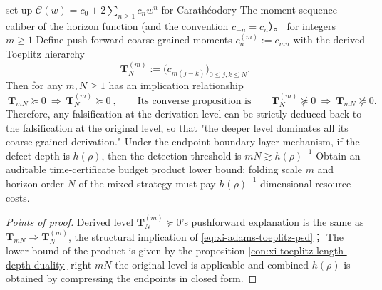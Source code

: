 \begin{conclusion}\label{con:xi-adams-coarsening-backprop-budget-product}
set up \(\mathscr{C}(w)=c_0+2\sum_{n\ge 1}c_n w^n\) for Carath\'eodory The moment sequence caliber of the horizon function (and the convention \(c_{-n}=\overline{c_n}\)）。
for integers \(m\ge 1\) Define push-forward coarse-grained moments
\(
c^{(m)}_n:=c_{mn}
\)
with the derived Toeplitz hierarchy
\[
\mathbf{T}^{(m)}_N:=\bigl(c_{m(j-k)}\bigr)_{0\le j,k\le N}.
\]
Then for any \(m,N\ge 1\) has an implication relationship
\[
\boxed{\ \mathbf{T}_{mN}\succeq 0\ \Longrightarrow\ \mathbf{T}^{(m)}_{N}\succeq 0\ },
\qquad\text{Its converse proposition is}\qquad
\mathbf{T}^{(m)}_{N}\nsucceq 0\ \Longrightarrow\ \mathbf{T}_{mN}\nsucceq 0.
\]
Therefore, any falsification at the derivation level can be strictly deduced back to the falsification at the original level, so that "the deeper level dominates all its coarse-grained derivation."
Under the endpoint boundary layer mechanism, if the defect depth is \(h(\rho)\), then the detection threshold is \(mN\gtrsim h(\rho)^{-1}\) Obtain an auditable time-certificate budget product lower bound: folding scale \(m\) and horizon order \(N\) of the mixed strategy must pay \(h(\rho)^{-1}\) dimensional resource costs.
\end{conclusion}
\begin{proof}[Points of proof]
Derived level \(\mathbf{T}^{(m)}_N\succeq 0\)'s pushforward explanation is the same as \(\mathbf{T}_{mN}\Rightarrow \mathbf{T}^{(m)}_{N}\), the structural implication of \eqref{eq:xi-adams-toeplitz-psd}；
The lower bound of the product is given by the proposition \ref{con:xi-toeplitz-length-depth-duality} right \(mN\) the original level is applicable and combined \(h(\rho)\) is obtained by compressing the endpoints in closed form.
\end{proof}

